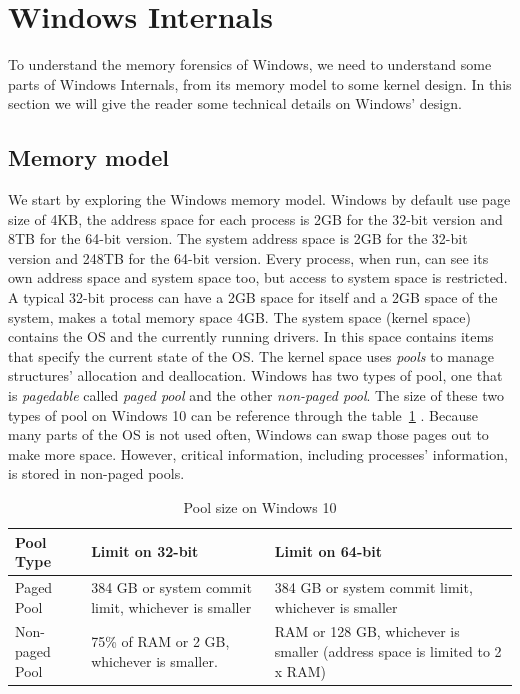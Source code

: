 \section[Windows Internals]{Windows Internals}

To understand the memory forensics of Windows, we need to understand some parts of Windows Internals, from its memory model to some kernel design. In this section we will give the reader some technical details on Windows' design.

\subsection[Memory model]{Memory model}

We start by exploring the Windows memory model. Windows by default use page size of 4KB, the address space for each process is 2GB for the 32-bit version and 8TB for the 64-bit version. The system address space is 2GB for the 32-bit version and 248TB for the 64-bit version. Every process, when run, can see its own address space and system space too, but access to system space is restricted. A typical 32-bit process can have a 2GB space for itself and a 2GB space of the system, makes a total memory space 4GB. The system space (kernel space) contains the OS and the currently running drivers. In this space contains items that specify the current state of the OS. The kernel space uses \textit{pools} to manage structures' allocation and deallocation. Windows has two types of pool, one that is \textit{pagedable} called \textit{paged pool} and the other \textit{non-paged pool}. The size of these two types of pool on Windows 10 can be reference through the table~\ref{tab:poolsize} \cite{memorylimit}. Because many parts of the OS is not used often, Windows can swap those pages out to make more space. However, critical information, including processes' information, is stored in non-paged pools.

\begin{center}
\begin{table}[h]
\begin{tabular}{|l|p{5cm}|p{5cm}|}
\hline
Pool Type & Limit on 32-bit & Limit on 64-bit \\ \hline
Paged Pool & 384 GB or system commit limit, whichever is smaller & 384 GB or system commit limit, whichever is smaller \\ \hline
Non-paged Pool & 75\% of RAM or 2 GB, whichever is smaller. & RAM or 128 GB, whichever is smaller (address space is limited to 2 x RAM) \\ \hline
\end{tabular}
\caption{Pool size on Windows 10}
\label{tab:poolsize}
\end{table}
\end{center}

